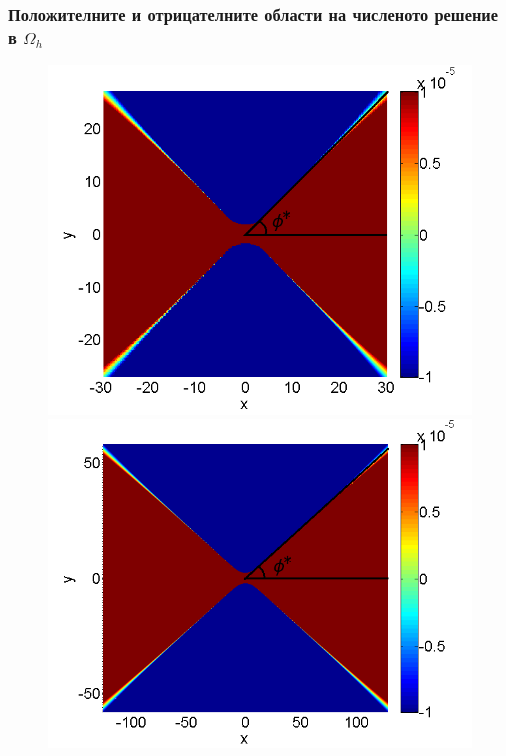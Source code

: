 \documentclass[a4paper]{article}
\theoremstyle{remark}
\begin{document}
\begin{large}
\subsubsection{Положителните и отрицателните области на численото решение в $\Omega_h$ }
\begin{figure}[ht]
	\begin{minipage}[b]{0.46\linewidth}
		\raggedleft
		\includegraphics[width=\linewidth]{NewBoundaryCondition/PosNeg_bt3_c045.png}
	\end{minipage}	
	\begin{minipage}[b]{0.49\linewidth}
		\raggedright
		 \includegraphics[width=\linewidth]{NewBoundaryCondition/PosNeg_bt1_c090.png}

\end{minipage}
\end{figure}
\end{large}
\end{document}

